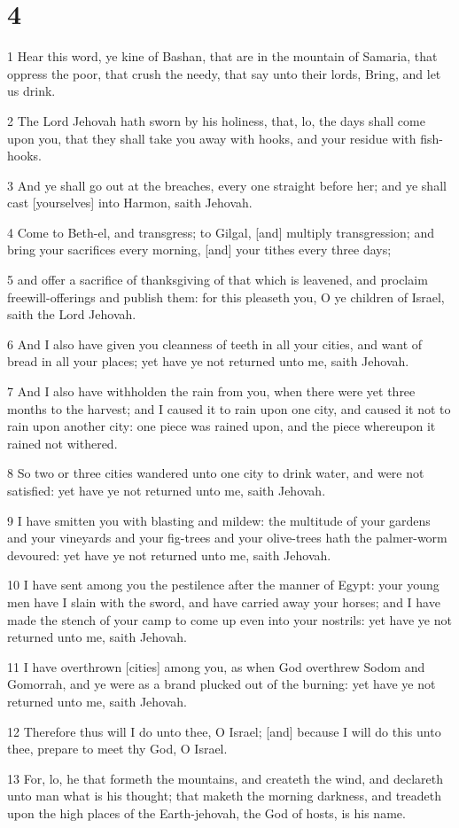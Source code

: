 \chapter{4}

\par 1 Hear this word, ye kine of Bashan, that are in the mountain of Samaria, that oppress the poor, that crush the needy, that say unto their lords, Bring, and let us drink.
\par 2 The Lord Jehovah hath sworn by his holiness, that, lo, the days shall come upon you, that they shall take you away with hooks, and your residue with fish-hooks.
\par 3 And ye shall go out at the breaches, every one straight before her; and ye shall cast [yourselves] into Harmon, saith Jehovah.
\par 4 Come to Beth-el, and transgress; to Gilgal, [and] multiply transgression; and bring your sacrifices every morning, [and] your tithes every three days;
\par 5 and offer a sacrifice of thanksgiving of that which is leavened, and proclaim freewill-offerings and publish them: for this pleaseth you, O ye children of Israel, saith the Lord Jehovah.
\par 6 And I also have given you cleanness of teeth in all your cities, and want of bread in all your places; yet have ye not returned unto me, saith Jehovah.
\par 7 And I also have withholden the rain from you, when there were yet three months to the harvest; and I caused it to rain upon one city, and caused it not to rain upon another city: one piece was rained upon, and the piece whereupon it rained not withered.
\par 8 So two or three cities wandered unto one city to drink water, and were not satisfied: yet have ye not returned unto me, saith Jehovah.
\par 9 I have smitten you with blasting and mildew: the multitude of your gardens and your vineyards and your fig-trees and your olive-trees hath the palmer-worm devoured: yet have ye not returned unto me, saith Jehovah.
\par 10 I have sent among you the pestilence after the manner of Egypt: your young men have I slain with the sword, and have carried away your horses; and I have made the stench of your camp to come up even into your nostrils: yet have ye not returned unto me, saith Jehovah.
\par 11 I have overthrown [cities] among you, as when God overthrew Sodom and Gomorrah, and ye were as a brand plucked out of the burning: yet have ye not returned unto me, saith Jehovah.
\par 12 Therefore thus will I do unto thee, O Israel; [and] because I will do this unto thee, prepare to meet thy God, O Israel.
\par 13 For, lo, he that formeth the mountains, and createth the wind, and declareth unto man what is his thought; that maketh the morning darkness, and treadeth upon the high places of the Earth-jehovah, the God of hosts, is his name.

